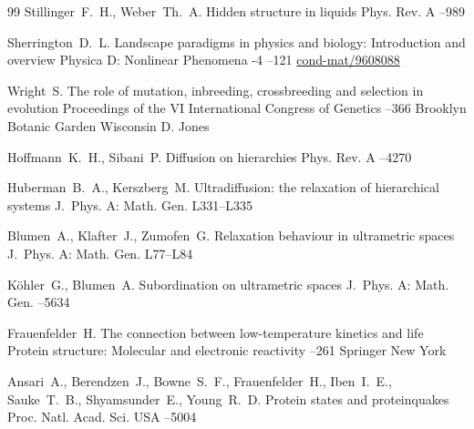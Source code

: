 \begin{thebibliography}{99}
\by Stillinger~F.~H., Weber~Th.~A.
\paper Hidden structure in liquids
\jour Phys. Rev. A
--989

\by Sherrington~D.~L.
\paper Landscape paradigms in physics and biology: Introduction and overview
\jour Physica D: Nonlinear Phenomena
-4
--121
\moreref
\arxiv \href{http://arxiv.org/abs/cond-mat/9608088}{cond-mat/9608088}

\by Wright~S.
\paper The role of mutation, inbreeding, crossbreeding and selection in evolution
\inbook Proceedings of the VI International Congress of Genetics
--366
\publ Brooklyn Botanic Garden
\publaddr Wisconsin
\ed D. Jones


\by Hoffmann~K.~H., Sibani~P.
\paper Diffusion on hierarchies
\jour Phys. Rev. A
--4270

\by Huberman~B.~A., Kerszberg~M.
\paper Ultradiffusion: the relaxation of hierarchical systems 
\jour J.~Phys. A: Math. Gen.
\pages L331--L335

\by Blumen~A., Klafter~J., Zumofen~G.
\paper Relaxation behaviour in ultrametric spaces
\jour J.~Phys. A: Math. Gen.
\pages L77--L84

\by K\"ohler~G., Blumen~A.
\paper Subordination on ultrametric spaces
\jour J.~Phys. A: Math. Gen.
--5634

\by Frauenfelder~H.
\paper The connection between low-temperature kinetics and life
\inbook Protein structure: Molecular and electronic reactivity
--261
\publ Springer
\publaddr New York


\by Ansari~A., 
    Berendzen~J.,
    Bowne~S.~F.,
    Frauenfelder~H.,
    Iben~I.~E.,
    Sauke~T.~B.,
    Shyamsunder~E., Young~R.~D.
\paper Protein states and proteinquakes
\jour Proc. Natl. Acad. Sci. USA
--5004


\end{thebibliography}
